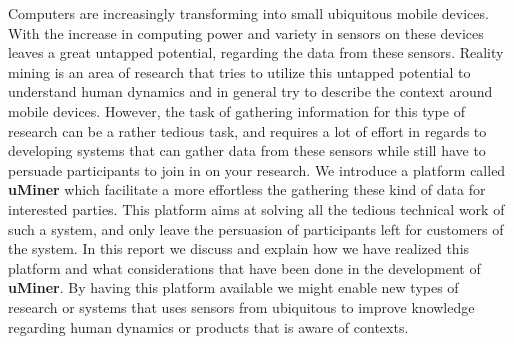 
Computers are increasingly transforming into small ubiquitous mobile devices. With the increase in computing power and variety in sensors on these devices leaves a great untapped potential, regarding the data from these sensors. 
Reality mining is an area of research that tries to utilize this untapped potential to understand human dynamics and in general try to describe the context around mobile devices. However, the task of gathering information for this type of research can be a rather tedious task, and requires a lot of effort in regards to developing systems that can gather data from these sensors while still have to persuade participants to join in on your research.
We introduce a platform called \textbf{uMiner} which facilitate a more effortless the gathering these kind of data for interested parties. This platform aims at solving all the tedious technical work of such a system, and only leave the persuasion of participants left for customers of the system.
In this report we discuss and explain how we have realized this platform and what considerations that have been done in the development of \textbf{uMiner}.
By having this platform available we might enable new types of research or systems that uses sensors from ubiquitous to improve knowledge regarding human dynamics or products that is aware of contexts.